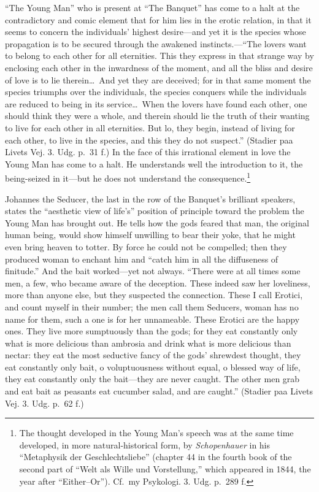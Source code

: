 \documentclass[12pt,a4paper]{book}
\newcommand{\opage}[1]{\marginnote{\footnotesize\textit{[#1]}}}
\begin{document}
``The Young Man'' who is present at ``The Banquet'' has come to a halt at
the contradictory and comic element that for him lies in the erotic
relation, in that it seems to concern the individuals' highest
desire---and yet it is the species whose propagation is to be secured
through the awakened instincts.---``The lovers want to belong to each
other for all eternities. This they express in that strange way by
enclosing each other in the inwardness of the moment, and all the bliss
and desire of love is to lie therein\dots\ And yet they are deceived; for
in that same moment the species triumphs over the individuals, the species
conquers while the individuals are reduced to being in its
service\dots\ When the lovers have found each other, one should think they
were a whole, and therein should lie the truth of their wanting to live for
each other in all eternities. But
\opage{87}lo, they begin, instead of living for each other, to live in the
species, and this they do not suspect.''
(Stadier paa Livets Vej. 3. Udg. p.~31 f.) In the face of this irrational
element in love the Young Man has come to a halt. He understands well the
introduction to it, the being-seized in it---but he does not understand the
consequence.\footnote{The thought developed in the Young Man's speech was
at the same time developed, in more natural-historical form, by
\textit{Schopenhauer} in his ``Metaphysik der Geschlechtsliebe'' (chapter
44 in the fourth book of the second part of ``Welt als Wille und
Vorstellung,'' which appeared in 1844, the year after ``Either--Or'').
Cf.\ my Psykologi. 3. Udg. p.~289 f.}

Johannes the Seducer, the last in the row of the Banquet's brilliant
speakers, states the ``aesthetic view of life's'' position of principle
toward the problem the Young Man has brought out. He tells how the gods
feared that man, the original human being, would show himself unwilling
to bear their yoke, that he might even bring heaven to totter. By force he
could not be compelled; then they produced woman to enchant him and
``catch him in all the diffuseness of finitude.'' And the bait
worked---yet not always. ``There were at all times some men, a few, who
became aware of the deception. These indeed saw her loveliness, more than
anyone else, but they suspected the connection. These I call Erotici, and
count myself in their number; the men call them Seducers, woman has no
name for them, such a one is for her unnameable. These Erotici are the
happy ones. They live more sumptuously than the gods; for they eat
constantly only what is more delicious than ambrosia and drink what is
more delicious than nectar: they eat the most seductive fancy of the gods'
shrewdest thought, they eat constantly only bait, o voluptuousness without
equal, o blessed way of life, they eat
\opage{88}constantly only the bait---they are never caught. The other men
grab and eat bait as peasants eat cucumber salad, and are caught.''
(Stadier paa Livets Vej. 3. Udg. p.~62 f.)
\end{document}
